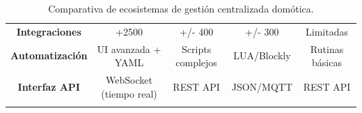 \begin{table}[H]
\begin{tabular}{|c|c|c|c|c|}
        \parbox[c]{4.5cm}{\vspace{0.2cm}\centering\textbf{Integraciones}\vspace{0.2cm}} & \parbox[c]{2.4cm}{\vspace{0.2cm}\centering +2500\vspace{0.2cm}} & \parbox[c]{2.2cm}{\vspace{0.2cm}\centering +/- 400\vspace{0.2cm}} & \parbox[c]{2.1cm}{\vspace{0.2cm}\centering +/- 300\vspace{0.2cm}} & \parbox[c]{2.5cm}{\vspace{0.2cm}\centering Limitadas\vspace{0.2cm}} \\ \hhline{|-|-|-|-|-|}
        \parbox[c]{4.5cm}{\vspace{0.2cm}\centering\textbf{Automatización}\vspace{0.2cm}} & \parbox[c]{2.4cm}{\vspace{0.2cm}\centering UI avanzada + YAML\vspace{0.2cm}} & \parbox[c]{2.2cm}{\vspace{0.2cm}\centering Scripts complejos\vspace{0.2cm}} & \parbox[c]{2.1cm}{\vspace{0.2cm}\centering LUA/\allowbreak Blockly\vspace{0.2cm}} & \parbox[c]{2.5cm}{\vspace{0.2cm}\centering Rutinas básicas\vspace{0.2cm}} \\ \hhline{|-|-|-|-|-|}
        \parbox[c]{4.5cm}{\vspace{0.2cm}\centering\textbf{Interfaz API}\vspace{0.2cm}} & \parbox[c]{2.4cm}{\vspace{0.2cm}\centering WebSocket (tiempo real)\vspace{0.2cm}} & \parbox[c]{2.2cm}{\vspace{0.2cm}\centering REST API\vspace{0.2cm}} & \parbox[c]{2.1cm}{\vspace{0.2cm}\centering JSON/\allowbreak MQTT\vspace{0.2cm}} & \parbox[c]{2.5cm}{\vspace{0.2cm}\centering REST API\vspace{0.2cm}} \\ \hhline{|-|-|-|-|-|}
    \end{tabular}
    \caption{Comparativa de ecosistemas de gestión centralizada domótica.}
    \label{tab:sw_domotica}
\end{table}

